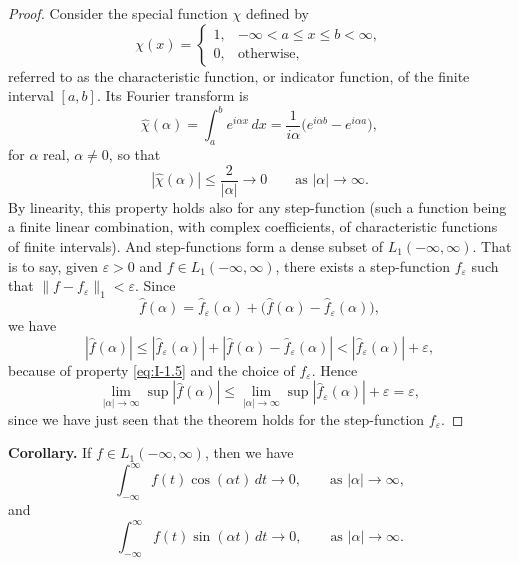 \begin{proof}
Consider the special function $\chi$ defined by
\begin{equation*}
\chi(x)=
\begin{cases}
1,&-\infty<a\le x\le b<\infty,\\
0,&\text{otherwise},
\end{cases}
\end{equation*}
referred to as the characteristic function, or indicator function, of the finite interval $[a,b]$. Its Fourier transform is
\begin{equation*}
\hat\chi(\alpha)=\int_a^b e^{i\alpha x}\,dx
=\frac{1}{i\alpha}\bigl(e^{i\alpha b}-e^{i\alpha a}\bigr),
\end{equation*}
for $\alpha$ real, $\alpha\neq 0$, so that
\begin{equation*}
|\hat\chi(\alpha)|\le\frac{2}{|\alpha|}\to 0\qquad\text{as }|\alpha|\to\infty.
\end{equation*}
By linearity, this property holds also for any step-function (such a function being a finite linear combination, with complex coefficients, of characteristic functions of finite intervals). And step-functions form a dense subset of $L_1(-\infty,\infty)$. That is to say, given $\varepsilon>0$ and $f\in L_1(-\infty,\infty)$, there exists a step-function $f_\varepsilon$ such that $\|f-f_\varepsilon\|_1<\varepsilon$. Since
\begin{equation*}
\widehat f(\alpha)=\widehat f_\varepsilon(\alpha)+\bigl(\widehat f(\alpha)-\widehat f_\varepsilon(\alpha)\bigr),
\end{equation*}
we have
\begin{equation*}
|\widehat f(\alpha)|
\le|\widehat f_\varepsilon(\alpha)|+|\widehat f(\alpha)-\widehat f_\varepsilon(\alpha)|
<|\widehat f_\varepsilon(\alpha)|+\varepsilon,
\end{equation*}
because of property \eqref{eq:I-1.5} and the choice of $f_\varepsilon$. Hence
\begin{equation*}
\lim_{|\alpha|\to\infty}\sup|\widehat f(\alpha)|
\le\lim_{|\alpha|\to\infty}\sup|\widehat f_\varepsilon(\alpha)|+\varepsilon=\varepsilon,
\end{equation*}
since we have just seen that the theorem holds for the step-function $f_\varepsilon$.
\end{proof}

\noindent\textbf{Corollary.}
If $f\in L_1(-\infty,\infty)$, then we have
\begin{equation*}
\int_{-\infty}^{\infty}f(t)\cos(\alpha t)\,dt\to 0,
\qquad\text{as }|\alpha|\to\infty,
\end{equation*}
and
\begin{equation*}
\int_{-\infty}^{\infty}f(t)\sin(\alpha t)\,dt\to 0,
\qquad\text{as }|\alpha|\to\infty.
\end{equation*}

